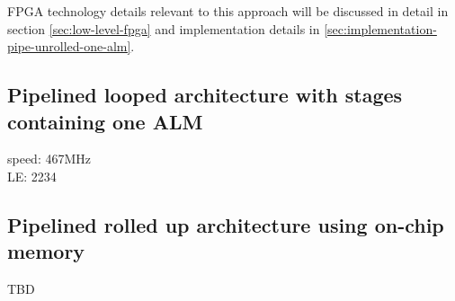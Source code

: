 FPGA technology details relevant to this approach will be discussed in detail in section \ref{sec:low-level-fpga} and implementation details in \ref{sec:implementation-pipe-unrolled-one-alm}. 


\subsection{Pipelined looped architecture with stages containing one ALM}

speed: 467MHz\\
LE: 2234


\subsection{Pipelined rolled up architecture using on-chip memory}
TBD
